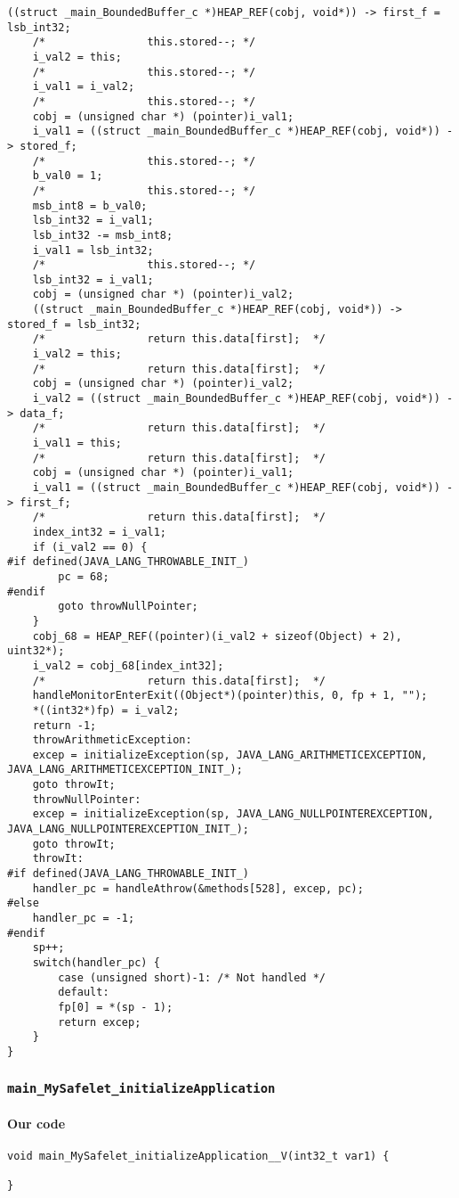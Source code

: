 \begin{lstlisting}[firstnumber=55060]
	((struct _main_BoundedBuffer_c *)HEAP_REF(cobj, void*)) -> first_f = lsb_int32;
	/*                this.stored--; */
	i_val2 = this;
	/*                this.stored--; */
	i_val1 = i_val2;
	/*                this.stored--; */
	cobj = (unsigned char *) (pointer)i_val1;
	i_val1 = ((struct _main_BoundedBuffer_c *)HEAP_REF(cobj, void*)) -> stored_f;
	/*                this.stored--; */
	b_val0 = 1;
	/*                this.stored--; */
	msb_int8 = b_val0;
	lsb_int32 = i_val1;
	lsb_int32 -= msb_int8;
	i_val1 = lsb_int32;
	/*                this.stored--; */
	lsb_int32 = i_val1;
	cobj = (unsigned char *) (pointer)i_val2;
	((struct _main_BoundedBuffer_c *)HEAP_REF(cobj, void*)) -> stored_f = lsb_int32;
	/*                return this.data[first];  */
	i_val2 = this;
	/*                return this.data[first];  */
	cobj = (unsigned char *) (pointer)i_val2;
	i_val2 = ((struct _main_BoundedBuffer_c *)HEAP_REF(cobj, void*)) -> data_f;
	/*                return this.data[first];  */
	i_val1 = this;
	/*                return this.data[first];  */
	cobj = (unsigned char *) (pointer)i_val1;
	i_val1 = ((struct _main_BoundedBuffer_c *)HEAP_REF(cobj, void*)) -> first_f;
	/*                return this.data[first];  */
	index_int32 = i_val1;
	if (i_val2 == 0) {
#if defined(JAVA_LANG_THROWABLE_INIT_)
		pc = 68;
#endif
		goto throwNullPointer;
	}
	cobj_68 = HEAP_REF((pointer)(i_val2 + sizeof(Object) + 2), uint32*);
	i_val2 = cobj_68[index_int32];
	/*                return this.data[first];  */
	handleMonitorEnterExit((Object*)(pointer)this, 0, fp + 1, "");
	*((int32*)fp) = i_val2;
	return -1;
	throwArithmeticException:
	excep = initializeException(sp, JAVA_LANG_ARITHMETICEXCEPTION, JAVA_LANG_ARITHMETICEXCEPTION_INIT_);
	goto throwIt;
	throwNullPointer:
	excep = initializeException(sp, JAVA_LANG_NULLPOINTEREXCEPTION, JAVA_LANG_NULLPOINTEREXCEPTION_INIT_);
	goto throwIt;
	throwIt:
#if defined(JAVA_LANG_THROWABLE_INIT_)
	handler_pc = handleAthrow(&methods[528], excep, pc);
#else
	handler_pc = -1;
#endif
	sp++;
	switch(handler_pc) {
		case (unsigned short)-1: /* Not handled */
		default:
		fp[0] = *(sp - 1);
		return excep;
	}
}
\end{lstlisting}

\subsubsection{\texttt{main\_MySafelet\_initializeApplication}}

\paragraph{Our code}\hfill
\begin{lstlisting}[firstnumber=2341]
void main_MySafelet_initializeApplication__V(int32_t var1) {
	
}
\end{lstlisting}

